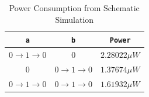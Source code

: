 \documentclass{article}
\begin{document}
	\begin{table}[H]
	\begin{center}
	\caption{Power Consumption from Schematic Simulation}
	\label{table::nor_gate_power_analysis_schem}
	\begin{tabular}{| c | c | c |}
		\hline
		\texttt{a} & \texttt{b} & \texttt{Power}\\
		\hline	
		$0 \rightarrow 1 \rightarrow 0$ & $0$ & $2.28022{\mu}W$ \\
		\hline	
		$0$ & $0 \rightarrow 1 \rightarrow 0$ & $1.37674{\mu}W$ \\
		\hline	
		$0 \rightarrow 1 \rightarrow 0$ & $0 \rightarrow 1 \rightarrow 0$ & $1.61932{\mu}W$\\
		\hline
	\end{tabular}
	\end{center}
	\end{table}
	
	
	
\end{document}
